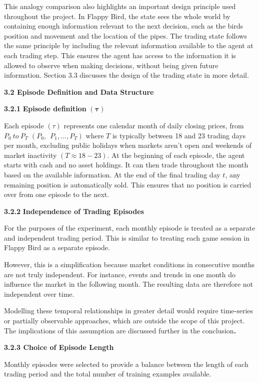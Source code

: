 This analogy comparison also highlights an important design principle
used throughout the project. In Flappy Bird, the state sees the whole
world by containing enough information relevant to the next decision,
such as the bird\textquotesingle s position and movement and the
location of the pipes. The trading state follows the same principle by
including the relevant information available to the agent at each
trading step. This ensures the agent has access to the information it is
allowed to observe when making decisions, without being given future
information. Section 3.3 discusses the design of the trading state in
more detail.

\textbf{3.2 Episode Definition and Data Structure}

\textbf{3.2.1} \textbf{Episode definition} \(\mathbf{(\tau)}\)

Each episode \((\tau)\) represents one calendar month of daily closing
prices, from \(P_{0}\ to\ P_{T}\) \((P_{0},\ \ P_{1},\ldots,P_{T})\)
where \(T\) is typically between 18 and 23 trading days per month,
excluding public holidays when markets aren't open and weekends of
market inactivity \((T \approx 18 - 23)\). At the beginning of each
episode, the agent starts with cash and no asset holdings. It can then
trade throughout the month based on the available information. At the
end of the final trading day \(t\), any remaining position is
automatically sold. This ensures that no position is carried over from
one episode to the next.

\textbf{3.2.2} \textbf{Independence of Trading Episodes}

For the purposes of the experiment, each monthly episode is treated as a
separate and independent trading period. This is similar to treating
each game session in Flappy Bird as a separate episode.

However, this is a simplification because market conditions in
consecutive months are not truly independent. For instance, events and
trends in one month do influence the market in the following month. The
resulting data are therefore not independent over time.

Modelling these temporal relationships in greater detail would require
time-series or partially observable approaches, which are outside the
scope of this project. The implications of this assumption are discussed
further in the conclusion\textbf{.}

\textbf{3.2.3 Choice of Episode Length}

Monthly episodes were selected to provide a balance between the length
of each trading period and the total number of training examples
available.

